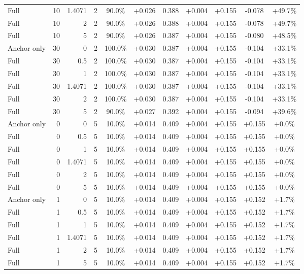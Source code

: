 \begin{table}[htbp]
\begin{tabular}{lrrrccccccc}
Full & 10 & 1.4071 & 2 & 90.0\% & +0.026 & 0.388 & +0.004 & +0.155 & -0.078 & +49.7\% \\
Full & 10 & 2 & 2 & 90.0\% & +0.026 & 0.388 & +0.004 & +0.155 & -0.078 & +49.7\% \\
Full & 10 & 5 & 2 & 90.0\% & +0.026 & 0.387 & +0.004 & +0.155 & -0.080 & +48.5\% \\
Anchor only & 30 & 0 & 2 & 100.0\% & +0.030 & 0.387 & +0.004 & +0.155 & -0.104 & +33.1\% \\
Full & 30 & 0.5 & 2 & 100.0\% & +0.030 & 0.387 & +0.004 & +0.155 & -0.104 & +33.1\% \\
Full & 30 & 1 & 2 & 100.0\% & +0.030 & 0.387 & +0.004 & +0.155 & -0.104 & +33.1\% \\
Full & 30 & 1.4071 & 2 & 100.0\% & +0.030 & 0.387 & +0.004 & +0.155 & -0.104 & +33.1\% \\
Full & 30 & 2 & 2 & 100.0\% & +0.030 & 0.387 & +0.004 & +0.155 & -0.104 & +33.1\% \\
Full & 30 & 5 & 2 & 90.0\% & +0.027 & 0.392 & +0.004 & +0.155 & -0.094 & +39.6\% \\
Anchor only & 0 & 0 & 5 & 10.0\% & +0.014 & 0.409 & +0.004 & +0.155 & +0.155 & +0.0\% \\
Full & 0 & 0.5 & 5 & 10.0\% & +0.014 & 0.409 & +0.004 & +0.155 & +0.155 & +0.0\% \\
Full & 0 & 1 & 5 & 10.0\% & +0.014 & 0.409 & +0.004 & +0.155 & +0.155 & +0.0\% \\
Full & 0 & 1.4071 & 5 & 10.0\% & +0.014 & 0.409 & +0.004 & +0.155 & +0.155 & +0.0\% \\
Full & 0 & 2 & 5 & 10.0\% & +0.014 & 0.409 & +0.004 & +0.155 & +0.155 & +0.0\% \\
Full & 0 & 5 & 5 & 10.0\% & +0.014 & 0.409 & +0.004 & +0.155 & +0.155 & +0.0\% \\
Anchor only & 1 & 0 & 5 & 10.0\% & +0.014 & 0.409 & +0.004 & +0.155 & +0.152 & +1.7\% \\
Full & 1 & 0.5 & 5 & 10.0\% & +0.014 & 0.409 & +0.004 & +0.155 & +0.152 & +1.7\% \\
Full & 1 & 1 & 5 & 10.0\% & +0.014 & 0.409 & +0.004 & +0.155 & +0.152 & +1.7\% \\
Full & 1 & 1.4071 & 5 & 10.0\% & +0.014 & 0.409 & +0.004 & +0.155 & +0.152 & +1.7\% \\
Full & 1 & 2 & 5 & 10.0\% & +0.014 & 0.409 & +0.004 & +0.155 & +0.152 & +1.7\% \\
Full & 1 & 5 & 5 & 10.0\% & +0.014 & 0.409 & +0.004 & +0.155 & +0.152 & +1.7\% \\

\end{tabular}
\end{table}
